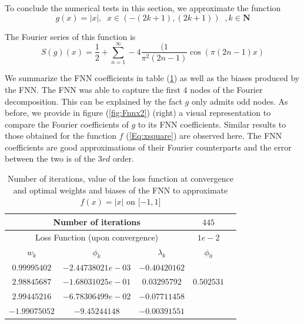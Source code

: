 \documentclass[AMS,STIX1COL]{WileyNJD-v2}
\begin{document}
To conclude the numerical tests in this section, we approximate the function
\begin{equation}\label{Eq:absx}
 g(x) = |x|, \;\; \text{$x \in \left(-(2k+1), (2k+1)\right)$}\;\;, k \in \mathbf{N}   
\end{equation}


The Fourier series of this function is
$$
S(g)(x)= \frac{1}{2} + \sum_{n=1}^{\infty} -4 \frac{(1}{\pi^2 (2n - 1)} \cos(\pi (2n - 1)x)
$$

We summarize the FNN coefficients in table (\ref{tab:tabfnnx2}) as well as the biases produced by the FNN. The FNN was able to capture the first $4$ nodes of the Fourier decomposition. This can be explained by the fact $g$ only admits odd nodes. As before, we provide in figure (\ref{fig:Fnnx2}) (right) a visual representation to compare the Fourier coefficients of $g$ to its FNN coefficients. Similar results to those obtained for the function $f$ (\ref{Eq:xsquare}) are observed here.  The FNN coefficients are good approximations of their Fourier counterparts and the error between the two is of the $3rd$ order.\\
\begin{table}[!h]
  \begin{center}
  \begin{tabular}{ |c|c|c|c|c| } 
    \hline
\multicolumn{3}{|c|}{Number of iterations}& $445$  \\
\hline
  \multicolumn{3}{|c|}{Loss Function (upon convergence)} & $1e-2$  \\
\hline
\hline
$w_k$ & $\phi_k$ & $\lambda_k$& $\phi_0$ \\
\hline
$ 0.99995402$ & $-2.44738021e-03$ &$-0.40420162$& \\ 
$2.98845687$&$-1.68031025e-01$ & $0.03295792$& $0.502531$ \\ 
$2.99445216$& $-6.78306499e-02$ & $-0.07711458$& \\ 
$ -1.99075052$& $-9.45244148$ & $ -0.00391551$& \\ 
\hline
\end{tabular}
\caption{\;Number of iterations, value of the loss function at convergence and optimal weights and biases of the FNN to approximate $ f(x) = |x|$ on $[-1, 1$]}\label{tab:tabfnnx2}
\end{center}
\end{table}
\end{document}
